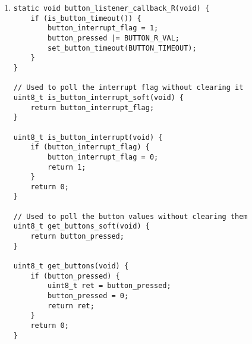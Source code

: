 \begin{enumerate}[label=\textbf{S.\arabic*},ref=S.\arabic*{ of Appendix A}]
\begin{adjustwidth}{-2em}{0pt}
\begin{lstlisting}
            case 2: // Make readings over a specified period, then average them
                if (is_pulse_timeout()) {
                    do_measurement();
                    pulseCounts++;
                    if (pulseCounts < MAX_PULSE_COUNTS) {
                        set_pulse_timeout(pulseTwo);
                        enable_capture();
                    } else {
                        // Disable LEDs to power implant
                        port_pin_set_output_level(LED_PIN, false);
                        if (numPoints > 0) {
                            glucose = (glucoseTemp / numPoints);
                            new_measurement = 1;
                        }
                        measure_busy = 0;
                        pulseState = 0;
                    }
                }
                break;

            default:
                pulseState = 0;
                break;
        }
    }
}

static void do_measurement(void) {
    disable_capture();

    if (nCap < 1)
        return; // Failure
    numPoints++;
    uint32_t sum = 0;
    // Start at 1, to ignore first read value
    for (uint16_t i = 1; i < nCap; i ++) {
        sum += (uint32_t)periods[i];
    }

    // Assumes 8MHz clock
    freq = 8000000.0f * (float)(nCap-1) / (float)sum;
    nCap = 0;

    glucoseTemp += GLUCOSE_CONVERSION(freq);
}
\end{lstlisting}
\end{adjustwidth}
\doublespacing

\item \label{is_button_interrupt}
\begin{adjustwidth}{-2em}{0pt}
\singlespacing
\nl
\begin{lstlisting}
static void button_listener_callback_R(void) {
    if (is_button_timeout()) {
        button_interrupt_flag = 1;
        button_pressed |= BUTTON_R_VAL;
        set_button_timeout(BUTTON_TIMEOUT);
    }
}

// Used to poll the interrupt flag without clearing it
uint8_t is_button_interrupt_soft(void) {
    return button_interrupt_flag;
}

uint8_t is_button_interrupt(void) {
    if (button_interrupt_flag) {
        button_interrupt_flag = 0;
        return 1;
    }
    return 0;
}

// Used to poll the button values without clearing them
uint8_t get_buttons_soft(void) {
    return button_pressed;
}

uint8_t get_buttons(void) {
    if (button_pressed) {
        uint8_t ret = button_pressed;
        button_pressed = 0;
        return ret;
    }
    return 0;
}
\end{lstlisting}
\end{adjustwidth}
\doublespacing

\end{enumerate}
